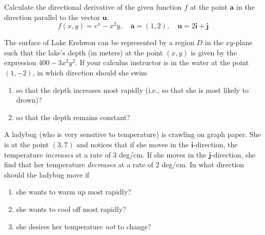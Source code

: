 \documentclass[12pt,letterpaper]{hmcpset}
\newcommand{\vb}{\mathbf}
\begin{document}
\begin{problem}[Colley 2.6.5]
  Calculate the directional derivative of the given function $f$ at the point $\vb a$ in the direction parallel to the vector $\vb u$.
  \[ f(x, y) = e^x - x^2y,\quad\vb a = (1, 2),\quad\vb u = 2\vb i + \vb j \]
\end{problem}
\clearpage

\begin{problem}[Colley 2.6.11]
  The surface of Lake Erehwon can be represented by a region $D$ in the $xy$-plane such that the lake’s depth (in meters) at the point $(x, y)$ is given by the expression $400 - 3x^2y^2$.
  If your calculus instructor is in the water at the point $(1, -2)$, in which direction should she swim
  \begin{enumerate}[label=(\alph*)]
  \item so that the depth increases most rapidly (i.e., so that she is most likely to drown)?
  \item so that the depth remains constant?
  \end{enumerate}
\end{problem}
\clearpage

\begin{problem}[Colley 2.6.12]
  A ladybug (who is very sensitive to temperature) is crawling on graph paper.
  She is at the point $(3, 7)$ and notices that if she moves in the $\vb i$-direction, the temperature \textit{increases} at a rate of 3 deg/cm.
  If she moves in the $\vb j$-direction, she find that her temperature \textit{decreases} at a rate of 2 deg/cm.
  In what direction should the ladybug move if
  \begin{enumerate}[label=(\alph*)]
  \item she wants to warm up most rapidly?
  \item she wants to cool off most rapidly?
  \item she desires her temperature \textit{not} to change?
  \end{enumerate}
\end{problem}
\clearpage
\end{document}
